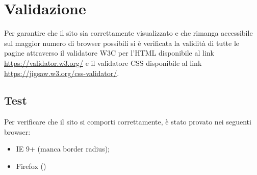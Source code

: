\section{Validazione}
Per garantire che il sito sia correttamente visualizzato e che rimanga accessibile sul maggior numero di browser possibili si è verificata la validità di tutte le pagine attraverso il validatore W3C per l'HTML disponibile al link \url{https://validator.w3.org/} e il validatore CSS disponibile al link \url{https://jigsaw.w3.org/css-validator/}.

\subsection{Test}
Per verificare che il sito si comporti correttamente, è stato provato nei seguenti browser:
\begin{itemize}
	\item IE 9+ (manca border radius);
	\item Firefox () 
\end{itemize}

\newpage